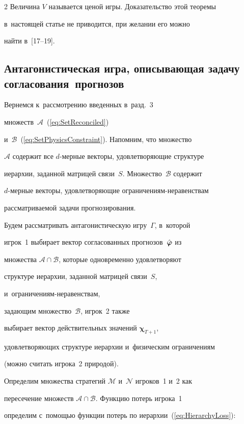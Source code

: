 \begin{multicols}{2}
Величина $V$ называется ценой игры. Доказательство этой теоремы

в~настоящей статье не приводится, при желании его можно

найти в~[17--19].



\subsection{Антагонистическая игра, описывающая задачу согласования~прогнозов}



Вернемся к~рассмотрению введенных в~разд.~3

множеств~$\mathcal{A}$~(\ref{eq:SetReconciled})

и~$\mathcal{B}$~(\ref{eq:SetPhysicsConstraint}). Напомним, что множество

$\mathcal{A}$ содержит все $d$-мер\-ные векторы, удовлетворяющие структуре

иерархии, заданной матрицей связи~$S$. Множество~$\mathcal{B}$ содержит

$d$-мер\-ные векторы, удовлетворяющие огра\-ни\-че\-ни\-ям-не\-ра\-вен\-ст\-вам

рассматриваемой задачи прогнозирования.



Будем рассматривать антагонистическую иг\-ру~$\Gamma$, в~которой

игрок~1 выбирает вектор согласованных прогнозов~$\hat{\boldsymbol{\varphi}}$ из

множества $\mathcal{A} \cap \mathcal{B}$, которые одновременно удовлетворяют

структуре иерархии, заданной матрицей связи~$S$,

и~огра\-ни\-че\-ни\-ям-не\-ра\-вен\-ст\-вам,

задающим множество~$\mathcal{B}$, игрок~2 также

выбирает вектор действительных значений $\boldsymbol{\chi}_{T+1}$,

удовлетворяющих структуре иерархии и~физическим ограничениям

(можно считать игрока~2 природой).



Определим множества стратегий $\mathcal{M}$ и~$\mathcal{N}$ игроков~1 и~2 как

пересечение множеств $\mathcal{A} \cap \mathcal{B}$. Функцию потерь игрока~1

определим с~помощью функции потерь по иерархии~(\ref{eq:HierarchyLoss}):


\end{multicols}
